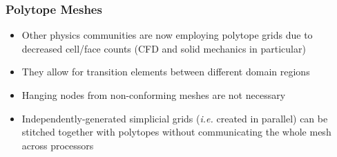 \documentclass[compress,10pt]{beamer}
\begin{document}
\begin{frame}[t]\frametitle{Polytope Meshes}
         \begin{block}{}{\footnotesize
			\begin{itemize}
				\item <1-> Other physics communities are now employing polytope grids due to decreased cell/face counts (CFD and solid mechanics in particular)
				\item <2-> They allow for transition elements between different domain regions
				\item <3-> Hanging nodes from non-conforming meshes are not necessary
				\item <4-> Independently-generated simplicial grids ({\em i.e.} created in parallel) can be stitched together with polytopes without communicating the whole mesh across processors
			\end{itemize}}
         \end{block}
\centering
{}
\end{frame}
\end{document}
